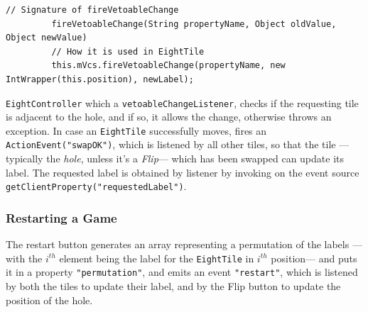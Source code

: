    {
      \begin{lstlisting}[label=lst:fireVetoableChange,captionpos=b,caption={How \lstinline|fireVetoableChange| is used in \lstinline|EightTile|}]
         // Signature of fireVetoableChange
         fireVetoableChange(String propertyName, Object oldValue, Object newValue)
         // How it is used in EightTile
         this.mVcs.fireVetoableChange(propertyName, new IntWrapper(this.position), newLabel);
      \end{lstlisting}
   }

\lstinline|EightController| which a \lstinline|vetoableChangeListener|, checks if the requesting tile is adjacent to the hole, and if so, it allows the change, otherwise throws an exception.
In case an \lstinline|EightTile| successfully moves, fires an \lstinline|ActionEvent("swapOK")|, which is listened by all other tiles, so that the tile ---typically the \textit{hole}, unless it's a \textit{Flip}--- which has been swapped can update its label.
The requested label is obtained by listener by invoking on the event source \lstinline|getClientProperty("requestedLabel")|.

\subsubsection{Restarting a Game}
The restart button generates an array representing a permutation of the labels ---with the $i^{th}$ element being the label for the \lstinline|EightTile| in $i^{th}$ position--- and puts it in a property \lstinline|"permutation"|, and emits an event \lstinline|"restart"|, which is listened by both the tiles to update their label, and by the Flip button to update the position of the hole.

